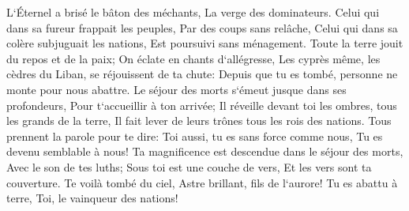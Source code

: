 \verse L`Éternel a brisé le bâton des méchants, La verge des dominateurs. 
\verse Celui qui dans sa fureur frappait les peuples, Par des coups sans relâche, Celui qui dans sa colère subjuguait les nations, Est poursuivi sans ménagement. 
\verse Toute la terre jouit du repos et de la paix; On éclate en chants d`allégresse, 
\verse Les cyprès même, les cèdres du Liban, se réjouissent de ta chute: Depuis que tu es tombé, personne ne monte pour nous abattre. 
\verse Le séjour des morts s`émeut jusque dans ses profondeurs, Pour t`accueillir à ton arrivée; Il réveille devant toi les ombres, tous les grands de la terre, Il fait lever de leurs trônes tous les rois des nations. 
\verse Tous prennent la parole pour te dire: Toi aussi, tu es sans force comme nous, Tu es devenu semblable à nous! 
\verse Ta magnificence est descendue dans le séjour des morts, Avec le son de tes luths; Sous toi est une couche de vers, Et les vers sont ta couverture. 
\verse Te voilà tombé du ciel, Astre brillant, fils de l`aurore! Tu es abattu à terre, Toi, le vainqueur des nations! 
